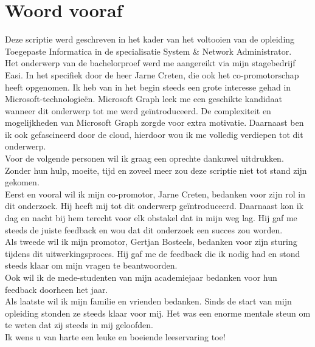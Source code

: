 
\chapter*{Woord vooraf}%
\label{ch:voorwoord}


Deze scriptie werd geschreven in het kader van het voltooien van de opleiding Toegepaste Informatica in de specialisatie System \& Network Administrator. \\

Het onderwerp van de bachelorproef werd me aangereikt via mijn stagebedrijf Easi. In het specifiek door de heer Jarne Creten, die ook het co-promotorschap heeft opgenomen. Ik heb van in het begin steeds een grote interesse gehad in Microsoft-technologieën. Microsoft Graph leek me een geschikte kandidaat wanneer dit onderwerp tot me werd geïntroduceerd. De complexiteit en mogelijkheden van Microsoft Graph zorgde voor extra motivatie. Daarnaast ben ik ook gefascineerd door de cloud, hierdoor wou ik me volledig verdiepen tot dit onderwerp. \\

Voor de volgende personen wil ik graag een oprechte dankuwel uitdrukken. Zonder hun hulp, moeite, tijd en zoveel meer zou deze scriptie niet tot stand zijn gekomen. \\

Eerst en vooral wil ik mijn co-promotor, Jarne Creten, bedanken voor zijn rol in dit onderzoek. Hij heeft mij tot dit onderwerp geïntroduceerd. Daarnaast kon ik dag en nacht bij hem terecht voor elk obstakel dat in mijn weg lag. Hij gaf me steeds de juiste feedback en wou dat dit onderzoek een succes zou worden. \\

Als tweede wil ik mijn promotor, Gertjan Bosteels, bedanken voor zijn sturing tijdens dit uitwerkingsproces. Hij gaf me de feedback die ik nodig had en stond steeds klaar om mijn vragen te beantwoorden. \\

Ook wil ik de mede-studenten van mijn academiejaar bedanken voor hun feedback doorheen het jaar. \\

Als laatste wil ik mijn familie en vrienden bedanken. Sinds de start van mijn opleiding stonden ze steeds klaar voor mij. Het was een enorme mentale steun om te weten dat zij steeds in mij geloofden. \\

Ik wens u van harte een leuke en boeiende leeservaring toe!

